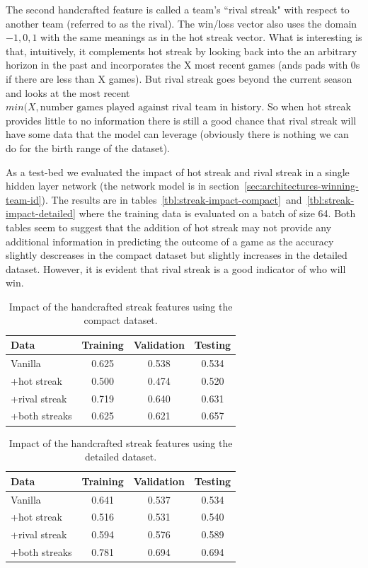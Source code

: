 \documentclass{article} %
\begin{document}
The second handcrafted feature is called a team's ``rival streak" with respect to another team (referred to as the rival). The win/loss vector also uses the domain ${-1, 0, 1}$ with the same meanings as in the hot streak vector.  What is interesting is that, intuitively, it complements hot streak by looking back into the an arbitrary horizon in the past and incorporates the X most recent games (ands pads with 0s if there are less than X games).  But rival streak goes beyond the current season and looks at the most recent $min(X, \text{number games played against rival team in history}$.  So when hot streak provides little to no information there is still a good chance that rival streak will have some data that the model can leverage (obviously there is nothing we can do for the birth range of the dataset).

As a test-bed we evaluated the impact of hot streak and rival streak in a single hidden layer network (the network model is in section~\ref{sec:architectures-winning-team-id}).  The results are in tables~\ref{tbl:streak-impact-compact}~and~\ref{tbl:streak-impact-detailed} where the training data is evaluated on a batch of size 64.  Both tables seem to suggest that the addition of hot streak may not provide any additional information in predicting the outcome of a game as the accuracy slightly descreases in the compact dataset but slightly increases in the detailed dataset.  However, it is evident that rival streak is a good indicator of who will win.

\begin{table}
\centering
  \begin{tabular}{|l|c|c|c|}
  \hline
  Data & Training & Validation & Testing\\
  \hline
  Vanilla & 0.625 & 0.538 & 0.534\\
  \hline
  +hot streak & 0.500 & 0.474 & 0.520\\
  \hline
  +rival streak & 0.719 & 0.640 & 0.631\\
  \hline
  +both streaks & 0.625 & 0.621 & 0.657\\
  \hline
  \end{tabular}
\caption{Impact of the handcrafted streak features using the compact dataset.}
\end{table}
\label{tbl:streak-impact-detaled}


\begin{table}
\centering
  \begin{tabular}{|l|c|c|c|}
  \hline
  Data & Training & Validation & Testing\\
  \hline
  Vanilla & 0.641 & 0.537 & 0.534\\
  \hline
  +hot streak & 0.516 & 0.531 & 0.540\\
  \hline
  +rival streak & 0.594 & 0.576 & 0.589\\
  \hline
  +both streaks & 0.781 & 0.694 & 0.694\\
  \hline
  \end{tabular}
  \caption{Impact of the handcrafted streak features using the detailed dataset.}
\end{table}
\label{tbl:streak-impact-detaled}
\end{document}
